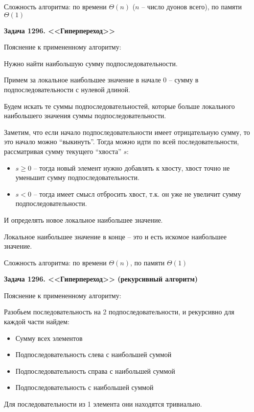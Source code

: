 \documentclass[12pt,a4paper]{article}
\begin{document}
    Сложность алгоритма: по времени $\Theta(n)$ ($n$ -- число дуонов всего), по памяти $\Theta(1)$

    \bigskip
    \textbf{Задача 1296. <<Гиперпереход>>}

    Пояснение к примененному алгоритму:

    Нужно найти наибольшую сумму подпоследовательности.

    Примем за локальное наибольшее значение в начале 0 -- сумму в подпоследовательности с нулевой длиной.

    Будем искать те суммы подпоследовательностей, которые больше локального наибольшего значения суммы подпоследовательности.

    Заметим, что если начало подпоследовательности имеет отрицательную сумму, то это начало можно ``выкинуть''.
    Тогда можно идти по всей последовательности, рассматривая сумму текущего ``хвоста'' $s$:
    \begin{itemize}
        \item $s\geq 0$ -- тогда новый элемент нужно добавлять к хвосту, хвост точно не уменьшит сумму подпоследовательности.
        \item $s<0$ -- тогда имеет смысл отбросить хвост, т.к. он уже не увеличит сумму подпоследовательности.
    \end{itemize}
    И определять новое локальное наибольшее значение.

    Локальное наибольшее значение в конце -- это и есть искомое наибольшее значение.

    Сложность алгоритма: по времени $\Theta(n)$, по памяти $\Theta(1)$

    \bigskip
    \textbf{Задача 1296. <<Гиперпереход>> (рекурсивный алгоритм)}

    Пояснение к примененному алгоритму:

    Разобьем последовательность на 2 подпоследовательности, и рекурсивно для каждой части найдем:
    \begin{itemize}
        \item Сумму всех элементов
        \item Подпоследовательность слева с наибольшей суммой
        \item Подпоследовательность справа с наибольшей суммой
        \item Подпоследовательность с наибольшей суммой
    \end{itemize}

    Для последовательности из 1 элемента они находятся тривиально.
\end{document}
